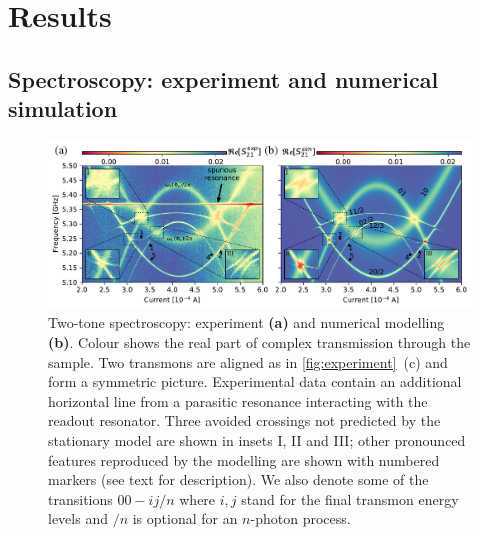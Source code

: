 \documentclass[%
 aip,
 amsmath,amssymb,
 reprint,%
]{revtex4-1}
\begin{document}
\section{Results}

\subsection{\label{sec:level1} Spectroscopy: experiment and numerical simulation}

\begin{figure}
	
	\centering
	\includegraphics[width=\linewidth]{main_picture}
	\caption{Two-tone spectroscopy: experiment \textbf{(a)} and numerical modelling \textbf{(b)}. Colour shows the real part of complex transmission  through the sample. Two transmons are aligned as in \autoref{fig:experiment}~(c) and form a symmetric picture. Experimental data contain an additional horizontal line from a parasitic resonance interacting with the readout resonator. Three avoided crossings not predicted by the stationary model are shown in insets I, II and III; other pronounced features reproduced by the modelling are shown with numbered markers (see text for description). We also denote some of the transitions $00 - ij/n$ where $i,j$ stand for the final transmon energy levels and $/n$ is optional for an $n$-photon process.}
	\label{fig:two-tone}
\end{figure}
\end{document}
